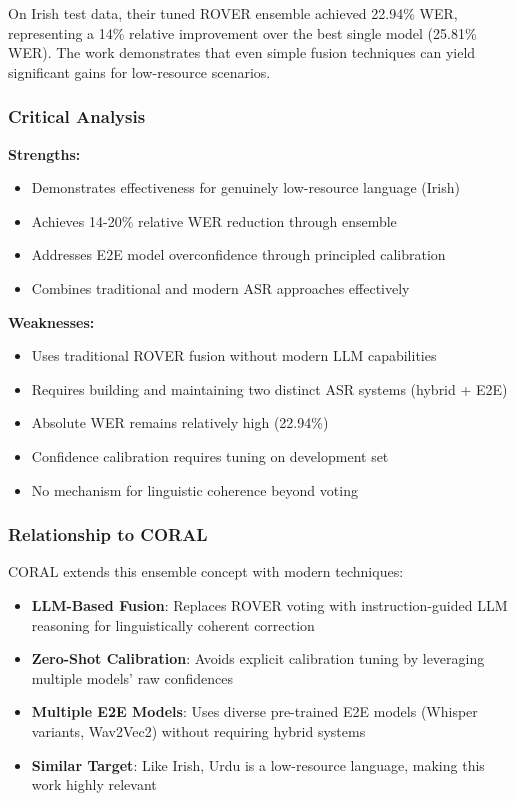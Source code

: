 On Irish test data, their tuned ROVER ensemble achieved 22.94\% WER, representing a 14\% relative improvement over the best single model (25.81\% WER). The work demonstrates that even simple fusion techniques can yield significant gains for low-resource scenarios.

\subsubsection{Critical Analysis}

\textbf{Strengths:}
\begin{itemize}[topsep=4pt,itemsep=2pt]
    \item Demonstrates effectiveness for genuinely low-resource language (Irish)
    \item Achieves 14-20\% relative WER reduction through ensemble
    \item Addresses E2E model overconfidence through principled calibration
    \item Combines traditional and modern ASR approaches effectively
\end{itemize}

\textbf{Weaknesses:}
\begin{itemize}[topsep=4pt,itemsep=2pt]
    \item Uses traditional ROVER fusion without modern LLM capabilities
    \item Requires building and maintaining two distinct ASR systems (hybrid + E2E)
    \item Absolute WER remains relatively high (22.94\%)
    \item Confidence calibration requires tuning on development set
    \item No mechanism for linguistic coherence beyond voting
\end{itemize}

\subsubsection{Relationship to CORAL}

CORAL extends this ensemble concept with modern techniques:

\begin{itemize}[topsep=4pt,itemsep=2pt]
    \item \textbf{LLM-Based Fusion}: Replaces ROVER voting with instruction-guided LLM reasoning for linguistically coherent correction
    \item \textbf{Zero-Shot Calibration}: Avoids explicit calibration tuning by leveraging multiple models' raw confidences
    \item \textbf{Multiple E2E Models}: Uses diverse pre-trained E2E models (Whisper variants, Wav2Vec2) without requiring hybrid systems
    \item \textbf{Similar Target}: Like Irish, Urdu is a low-resource language, making this work highly relevant
\end{itemize}

